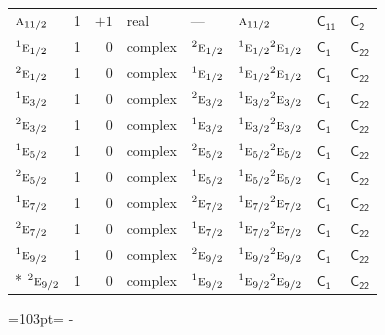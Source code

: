 \documentclass[10pt,a4paper]{article}
\makeatletter
\def\grouprule#1#2{\noalign{\marks\LTgroupmarks{\the\belowrulesep}\nobreak\vskip#1%
  \vskip\aboverulesep}\multispan\LT@cols\unskip{\leaders\hrule\@height#2\hfill\kern\z@}\cr
  \noalign{\penalty\LTrulebreak\vskip\belowrulesep\global\@lastruleclass\z@}}
\newcommand{\needspace}[1]{\par\penalty-100\begingroup\dimen0=#1\relax\dimen2=\pagegoal
  \advance\dimen2-\pagetotal\ifdim\dimen0>\dimen2\relax\ifdim\dimen2>0pt\vfil\break\fi\fi
  \endgroup}
\numberwithin{equation}{section}
\newcommand{\grp}[1]{\mathsf{#1}}
\newcommand{\irr}[1]{\text{\normalfont\scshape #1}}
\newcommand{\conjpair}[1]{{}^{#1}}
\makeatother
\begin{document}
{\begin{longtable}{@{}lrrlllll@{}}
\grouprule{0pt}{\lightrulewidth}
$\irr{a}_{11/2}$ & 1 & $+1$ & real & --- & $\irr{a}_{11/2}$ & \href{C11.pdf}{$\grp{C_{11}}$} & \href{../../../rotation/data/pdf/C2.pdf}{$\grp{C_{2}}$}\\
$\conjpair{1}\irr{e}_{1/2}$ & 1 & $0$ & complex & $\conjpair{2}\irr{e}_{1/2}$ & $\conjpair{1}\irr{e}_{1/2}\conjpair{2}\irr{e}_{1/2}$ & \href{C1.pdf}{$\grp{C_{1}}$} & $\grp{C_{22}}$\\
$\conjpair{2}\irr{e}_{1/2}$ & 1 & $0$ & complex & $\conjpair{1}\irr{e}_{1/2}$ & $\conjpair{1}\irr{e}_{1/2}\conjpair{2}\irr{e}_{1/2}$ & \href{C1.pdf}{$\grp{C_{1}}$} & $\grp{C_{22}}$\\
$\conjpair{1}\irr{e}_{3/2}$ & 1 & $0$ & complex & $\conjpair{2}\irr{e}_{3/2}$ & $\conjpair{1}\irr{e}_{3/2}\conjpair{2}\irr{e}_{3/2}$ & \href{C1.pdf}{$\grp{C_{1}}$} & $\grp{C_{22}}$\\
$\conjpair{2}\irr{e}_{3/2}$ & 1 & $0$ & complex & $\conjpair{1}\irr{e}_{3/2}$ & $\conjpair{1}\irr{e}_{3/2}\conjpair{2}\irr{e}_{3/2}$ & \href{C1.pdf}{$\grp{C_{1}}$} & $\grp{C_{22}}$\\
$\conjpair{1}\irr{e}_{5/2}$ & 1 & $0$ & complex & $\conjpair{2}\irr{e}_{5/2}$ & $\conjpair{1}\irr{e}_{5/2}\conjpair{2}\irr{e}_{5/2}$ & \href{C1.pdf}{$\grp{C_{1}}$} & $\grp{C_{22}}$\\
$\conjpair{2}\irr{e}_{5/2}$ & 1 & $0$ & complex & $\conjpair{1}\irr{e}_{5/2}$ & $\conjpair{1}\irr{e}_{5/2}\conjpair{2}\irr{e}_{5/2}$ & \href{C1.pdf}{$\grp{C_{1}}$} & $\grp{C_{22}}$\\
$\conjpair{1}\irr{e}_{7/2}$ & 1 & $0$ & complex & $\conjpair{2}\irr{e}_{7/2}$ & $\conjpair{1}\irr{e}_{7/2}\conjpair{2}\irr{e}_{7/2}$ & \href{C1.pdf}{$\grp{C_{1}}$} & $\grp{C_{22}}$\\
$\conjpair{2}\irr{e}_{7/2}$ & 1 & $0$ & complex & $\conjpair{1}\irr{e}_{7/2}$ & $\conjpair{1}\irr{e}_{7/2}\conjpair{2}\irr{e}_{7/2}$ & \href{C1.pdf}{$\grp{C_{1}}$} & $\grp{C_{22}}$\\
$\conjpair{1}\irr{e}_{9/2}$ & 1 & $0$ & complex & $\conjpair{2}\irr{e}_{9/2}$ & $\conjpair{1}\irr{e}_{9/2}\conjpair{2}\irr{e}_{9/2}$ & \href{C1.pdf}{$\grp{C_{1}}$} & $\grp{C_{22}}$\\*
$\conjpair{2}\irr{e}_{9/2}$ & 1 & $0$ & complex & $\conjpair{1}\irr{e}_{9/2}$ & $\conjpair{1}\irr{e}_{9/2}\conjpair{2}\irr{e}_{9/2}$ & \href{C1.pdf}{$\grp{C_{1}}$} & $\grp{C_{22}}$\\
\bottomrule\end{longtable}}
\needspace{103pt}
\end{document}
